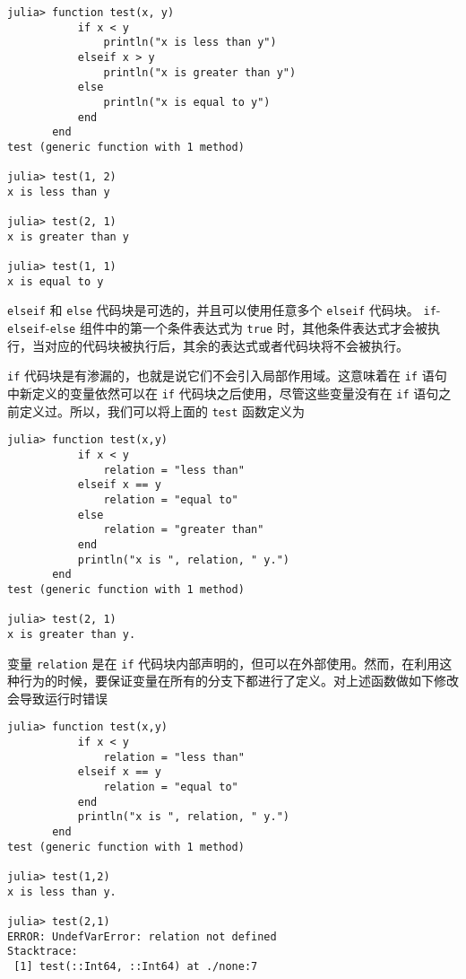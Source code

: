 \begin{verbatim}
julia> function test(x, y)
           if x < y
               println("x is less than y")
           elseif x > y
               println("x is greater than y")
           else
               println("x is equal to y")
           end
       end
test (generic function with 1 method)

julia> test(1, 2)
x is less than y

julia> test(2, 1)
x is greater than y

julia> test(1, 1)
x is equal to y
\end{verbatim}



\texttt{elseif} 和 \texttt{else} 代码块是可选的，并且可以使用任意多个 \texttt{elseif} 代码块。 \texttt{if}-\texttt{elseif}-\texttt{else} 组件中的第一个条件表达式为 \texttt{true} 时，其他条件表达式才会被执行，当对应的代码块被执行后，其余的表达式或者代码块将不会被执行。



\texttt{if} 代码块是{\textquotedbl}有渗漏的{\textquotedbl}，也就是说它们不会引入局部作用域。这意味着在 \texttt{if} 语句中新定义的变量依然可以在 \texttt{if} 代码块之后使用，尽管这些变量没有在 \texttt{if} 语句之前定义过。所以，我们可以将上面的 \texttt{test} 函数定义为




\begin{verbatim}
julia> function test(x,y)
           if x < y
               relation = "less than"
           elseif x == y
               relation = "equal to"
           else
               relation = "greater than"
           end
           println("x is ", relation, " y.")
       end
test (generic function with 1 method)

julia> test(2, 1)
x is greater than y.
\end{verbatim}



变量 \texttt{relation} 是在 \texttt{if} 代码块内部声明的，但可以在外部使用。然而，在利用这种行为的时候，要保证变量在所有的分支下都进行了定义。对上述函数做如下修改会导致运行时错误




\begin{verbatim}
julia> function test(x,y)
           if x < y
               relation = "less than"
           elseif x == y
               relation = "equal to"
           end
           println("x is ", relation, " y.")
       end
test (generic function with 1 method)

julia> test(1,2)
x is less than y.

julia> test(2,1)
ERROR: UndefVarError: relation not defined
Stacktrace:
 [1] test(::Int64, ::Int64) at ./none:7
\end{verbatim}



